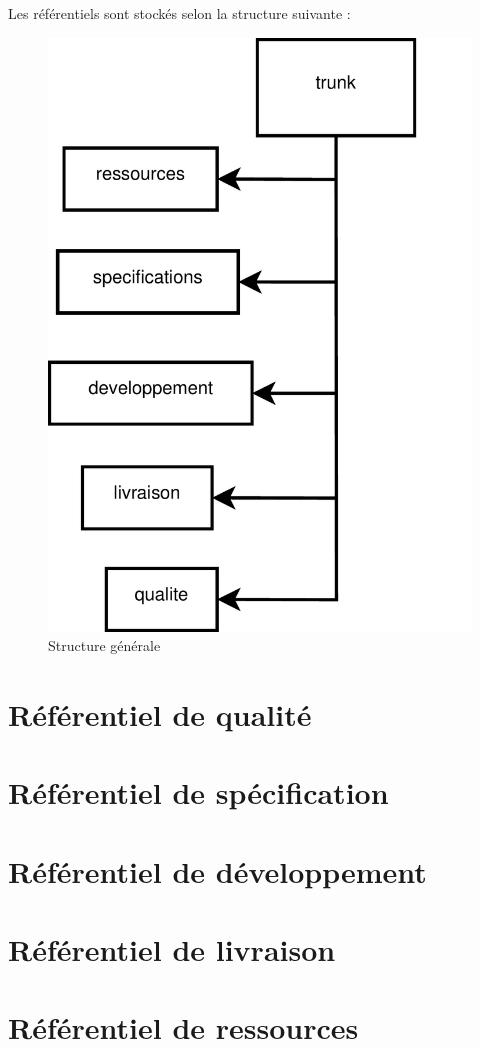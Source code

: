 Les référentiels sont stockés selon la structure suivante : 

\begin{figure}[ht]
         \begin{center}
         \includegraphics[scale=0.5]{images/arboTrunk}
         \end{center}
         \caption{Structure générale}
 \end{figure}
 
 \section{Référentiel de qualité}
 
  
 \section{Référentiel de spécification}
 
 
  \section{Référentiel de développement}
 
 
  \section{Référentiel de livraison}
 
 
  \section{Référentiel de ressources}
 

